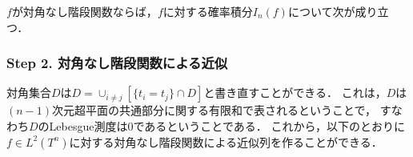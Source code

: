 \begin{lemma}\label{lem9.6.2and9.6.3}%
$f$が対角なし階段関数ならば，$f$に対する確率積分$I_n(f)$について次が成り立つ．
\end{lemma}

\subsubsection*{Step 2. 対角なし階段関数による近似}
対角集合$D$は$D=\cup_{i\neq j}[\{t_i=t_j\}\cap D]$と書き直すことができる．
これは，$D$は$(n-1)$次元超平面の共通部分に関する有限和で表されるということで，
すなわち$D$のLebesgue測度は$0$であるということである．
これから，以下のとおりに$f\in L^2(T^n)$に対する対角なし階段関数による近似列を作ることができる．

